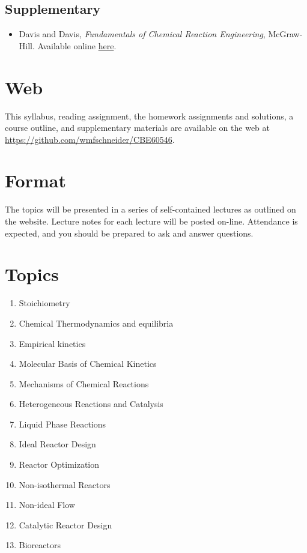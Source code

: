 \documentclass[11pt]{article}
\begin{document}
\subsection{Supplementary}
\label{sec:org53b8a2e}
\begin{itemize}
\item Davis and Davis, \emph{Fundamentals of Chemical Reaction Engineering}, McGraw-Hill. Available online \href{https://authors.library.caltech.edu/25070/}{here}.
\end{itemize}

\section{Web}
\label{sec:org46ce7ad}
This syllabus, reading assignment, the homework assignments and solutions, a course outline, and supplementary materials are available on the web at \url{https://github.com/wmfschneider/CBE60546}.

\section{Format}
\label{sec:orga5aa398}
The topics will be presented in a series of self-contained lectures as outlined on the website. Lecture notes for each lecture will be posted on-line. Attendance is expected, and you should be prepared to ask and answer questions.

\section{Topics}
\label{sec:org1366c4e}
\begin{enumerate}
\item Stoichiometry
\item Chemical Thermodynamics and equilibria
\item Empirical kinetics
\item Molecular Basis of Chemical Kinetics
\item Mechanisms of Chemical Reactions
\item Heterogeneous Reactions and Catalysis
\item Liquid Phase Reactions
\item Ideal Reactor Design
\item Reactor Optimization
\item Non-isothermal Reactors
\item Non-ideal Flow
\item Catalytic Reactor Design
\item Bioreactors
\end{enumerate}
\end{document}
